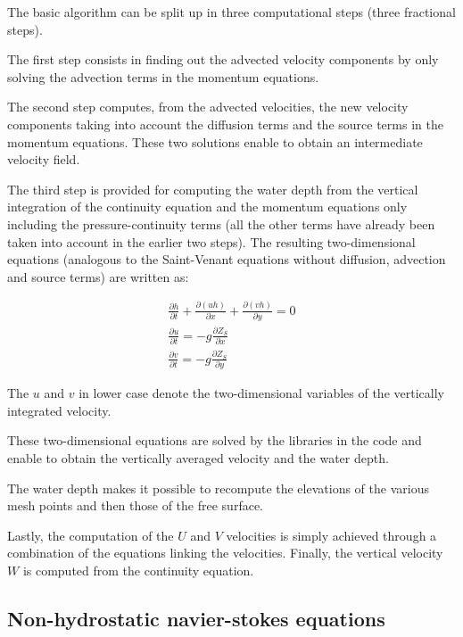 The  basic algorithm can be split up in three computational steps
(three fractional steps).

The first step consists in finding out the advected velocity components by
only solving the advection terms in the momentum equations.

The second step computes, from the advected velocities, the new velocity
components taking into account the diffusion terms and the source terms in the
momentum equations. These two solutions enable to obtain an intermediate
velocity field.

The third step is provided for computing the water depth from the vertical
integration of the continuity equation and the momentum equations only
including the pressure-continuity terms (all the other terms have already been
taken into account in the earlier two steps). The resulting two-dimensional
equations (analogous to the Saint-Venant equations without diffusion, advection
and source terms) are written as:

\begin{subequations}
\begin{align}
\frac{\partial h}{\partial t} +\frac{\partial \left(uh\right)}{\partial x}
+\frac{\partial \left(vh\right)}{\partial y} =0
\\
\frac{\partial u}{\partial t} =-g\frac{\partial Z_{S} }{\partial x}
\\
\frac{\partial v}{\partial t} =-g\frac{\partial Z_{S} }{\partial y}
\end{align}
\end{subequations}

The $u$ and $v$ in lower case denote the two-dimensional
variables of the vertically integrated velocity.

These two-dimensional equations are solved by the libraries in the 
code and enable to obtain the vertically averaged velocity and the water depth.

The water depth makes it possible to recompute the elevations of the various
mesh points and then those of the free surface.

Lastly, the computation of the $U$ and $V$ velocities is simply achieved
through a combination of the equations linking the velocities. Finally, the
vertical velocity $W$ is computed from the continuity equation.

\subsection{Non-hydrostatic navier-stokes equations}

